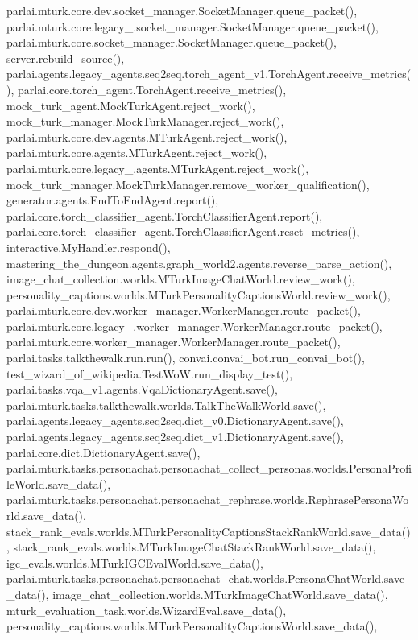 parlai.\+mturk.\+core.\+dev.\+socket\+\_\+manager.\+Socket\+Manager.\+queue\+\_\+packet(), parlai.\+mturk.\+core.\+legacy\+\_.\+socket\+\_\+manager.\+Socket\+Manager.\+queue\+\_\+packet(), parlai.\+mturk.\+core.\+socket\+\_\+manager.\+Socket\+Manager.\+queue\+\_\+packet(), server.\+rebuild\+\_\+source(), parlai.\+agents.\+legacy\+\_\+agents.\+seq2seq.\+torch\+\_\+agent\+\_\+v1.\+Torch\+Agent.\+receive\+\_\+metrics(), parlai.\+core.\+torch\+\_\+agent.\+Torch\+Agent.\+receive\+\_\+metrics(), mock\+\_\+turk\+\_\+agent.\+Mock\+Turk\+Agent.\+reject\+\_\+work(), mock\+\_\+turk\+\_\+manager.\+Mock\+Turk\+Manager.\+reject\+\_\+work(), parlai.\+mturk.\+core.\+dev.\+agents.\+M\+Turk\+Agent.\+reject\+\_\+work(), parlai.\+mturk.\+core.\+agents.\+M\+Turk\+Agent.\+reject\+\_\+work(), parlai.\+mturk.\+core.\+legacy\+\_.\+agents.\+M\+Turk\+Agent.\+reject\+\_\+work(), mock\+\_\+turk\+\_\+manager.\+Mock\+Turk\+Manager.\+remove\+\_\+worker\+\_\+qualification(), generator.\+agents.\+End\+To\+End\+Agent.\+report(), parlai.\+core.\+torch\+\_\+classifier\+\_\+agent.\+Torch\+Classifier\+Agent.\+report(), parlai.\+core.\+torch\+\_\+classifier\+\_\+agent.\+Torch\+Classifier\+Agent.\+reset\+\_\+metrics(), interactive.\+My\+Handler.\+respond(), mastering\+\_\+the\+\_\+dungeon.\+agents.\+graph\+\_\+world2.\+agents.\+reverse\+\_\+parse\+\_\+action(), image\+\_\+chat\+\_\+collection.\+worlds.\+M\+Turk\+Image\+Chat\+World.\+review\+\_\+work(), personality\+\_\+captions.\+worlds.\+M\+Turk\+Personality\+Captions\+World.\+review\+\_\+work(), parlai.\+mturk.\+core.\+dev.\+worker\+\_\+manager.\+Worker\+Manager.\+route\+\_\+packet(), parlai.\+mturk.\+core.\+legacy\+\_.\+worker\+\_\+manager.\+Worker\+Manager.\+route\+\_\+packet(), parlai.\+mturk.\+core.\+worker\+\_\+manager.\+Worker\+Manager.\+route\+\_\+packet(), parlai.\+tasks.\+talkthewalk.\+run.\+run(), convai.\+convai\+\_\+bot.\+run\+\_\+convai\+\_\+bot(), test\+\_\+wizard\+\_\+of\+\_\+wikipedia.\+Test\+Wo\+W.\+run\+\_\+display\+\_\+test(), parlai.\+tasks.\+vqa\+\_\+v1.\+agents.\+Vqa\+Dictionary\+Agent.\+save(), parlai.\+mturk.\+tasks.\+talkthewalk.\+worlds.\+Talk\+The\+Walk\+World.\+save(), parlai.\+agents.\+legacy\+\_\+agents.\+seq2seq.\+dict\+\_\+v0.\+Dictionary\+Agent.\+save(), parlai.\+agents.\+legacy\+\_\+agents.\+seq2seq.\+dict\+\_\+v1.\+Dictionary\+Agent.\+save(), parlai.\+core.\+dict.\+Dictionary\+Agent.\+save(), parlai.\+mturk.\+tasks.\+personachat.\+personachat\+\_\+collect\+\_\+personas.\+worlds.\+Persona\+Profile\+World.\+save\+\_\+data(), parlai.\+mturk.\+tasks.\+personachat.\+personachat\+\_\+rephrase.\+worlds.\+Rephrase\+Persona\+World.\+save\+\_\+data(), stack\+\_\+rank\+\_\+evals.\+worlds.\+M\+Turk\+Personality\+Captions\+Stack\+Rank\+World.\+save\+\_\+data(), stack\+\_\+rank\+\_\+evals.\+worlds.\+M\+Turk\+Image\+Chat\+Stack\+Rank\+World.\+save\+\_\+data(), igc\+\_\+evals.\+worlds.\+M\+Turk\+I\+G\+C\+Eval\+World.\+save\+\_\+data(), parlai.\+mturk.\+tasks.\+personachat.\+personachat\+\_\+chat.\+worlds.\+Persona\+Chat\+World.\+save\+\_\+data(), image\+\_\+chat\+\_\+collection.\+worlds.\+M\+Turk\+Image\+Chat\+World.\+save\+\_\+data(), mturk\+\_\+evaluation\+\_\+task.\+worlds.\+Wizard\+Eval.\+save\+\_\+data(), personality\+\_\+captions.\+worlds.\+M\+Turk\+Personality\+Captions\+World.\+save\+\_\+data(), 